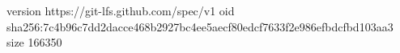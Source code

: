 version https://git-lfs.github.com/spec/v1
oid sha256:7c4b96c7dd2dacce468b2927bc4ee5aecf80edcf7633f2e986efbdcfbd103aa3
size 166350
